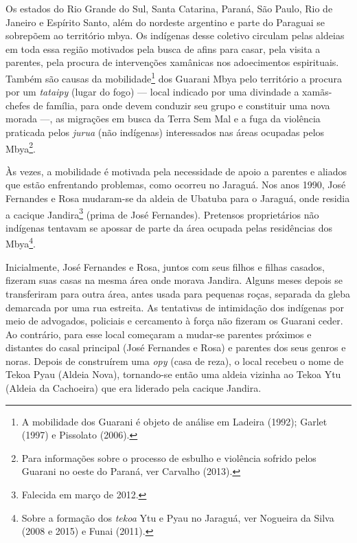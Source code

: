 Os estados do Rio Grande do Sul, Santa Catarina, Paraná, São Paulo, Rio
de Janeiro e Espírito Santo, além do nordeste argentino e parte do
Paraguai se sobrepõem ao território mbya. Os indígenas desse coletivo
circulam pelas aldeias em toda essa região motivados pela busca de afins
para casar, pela visita a parentes, pela procura de intervenções
xamânicas nos adoecimentos espirituais. Também são causas da
mobilidade\footnote{A mobilidade dos Guarani é objeto de análise em
  Ladeira (1992); Garlet (1997) e Pissolato (2006).} dos Guarani Mbya
pelo território a procura por um \emph{tataipy} (lugar do fogo) ---
local indicado por uma divindade a xamãs-chefes de família, para onde
devem conduzir seu grupo e constituir uma nova morada ---, as migrações
em busca da Terra Sem Mal e a fuga da violência praticada pelos
\emph{jurua} (não indígenas) interessados nas áreas ocupadas pelos
Mbya\footnote{Para informações sobre o processo de esbulho e violência
  sofrido pelos Guarani no oeste do Paraná, ver Carvalho (2013).}.

Às vezes, a mobilidade é motivada pela necessidade de apoio a parentes e
aliados que estão enfrentando problemas, como ocorreu no Jaraguá. Nos
anos 1990, José Fernandes e Rosa mudaram-se da aldeia de Ubatuba para o
Jaraguá, onde residia a cacique Jandira\footnote{Falecida em março de
  2012.} (prima de José Fernandes). Pretensos proprietários não
indígenas tentavam se apossar de parte da área ocupada pelas residências
dos Mbya\footnote{Sobre a formação dos \emph{tekoa} Ytu e Pyau no
  Jaraguá, ver Nogueira da Silva (2008 e 2015) e Funai (2011).}.

Inicialmente, José Fernandes e Rosa, juntos com seus filhos e filhas
casados, fizeram suas casas na mesma área onde morava Jandira. Alguns
meses depois se transferiram para outra área, antes usada para pequenas
roças, separada da gleba demarcada por uma rua estreita. As tentativas
de intimidação dos indígenas por meio de advogados, policiais e
cercamento à força não fizeram os Guarani ceder. Ao contrário, para esse
local começaram a mudar-se parentes próximos e distantes do casal
principal (José Fernandes e Rosa) e parentes dos seus genros e noras.
Depois de construírem uma \emph{opy} (casa de reza), o local recebeu o
nome de Tekoa Pyau (Aldeia Nova), tornando-se então uma aldeia vizinha
ao Tekoa Ytu (Aldeia da Cachoeira) que era liderado pela cacique
Jandira.

